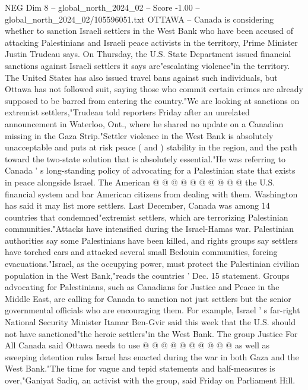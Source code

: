 \begin{textsample}{NEG Dim 8 – global\_north\_2024\_02 – Score -1.00 – global\_north\_2024\_02/105596051.txt}  \label{ex:f8_neg_434}
OTTAWA -- Canada is considering whether to sanction Israeli settlers in the West Bank who have been accused of attacking Palestinians and Israeli peace activists in the territory, Prime Minister Justin Trudeau says.
On Thursday, the U.S.
State Department issued financial sanctions against Israeli settlers it says are"escalating violence"in the territory.
The United States has also issued travel bans against such individuals, but Ottawa has not followed suit, saying those who commit certain crimes are already supposed to be barred from entering the country."We are looking at sanctions on extremist settlers,"Trudeau told reporters Friday after an unrelated announcement in Waterloo, Ont., where he shared no update on a Canadian missing in the Gaza Strip."Settler violence in the West Bank is absolutely unacceptable and puts at risk peace ( and ) stability in the region, and the path toward the two-state solution that is absolutely essential."He was referring to Canada ' s long-standing policy of advocating for a Palestinian state that exists in peace alongside Israel.
The American @ @ @ @ @ @ @ @ @ @ the U.S. financial system and bar American citizens from dealing with them.
Washington has said it may list more settlers.
Last December, Canada was among 14 countries that condemned"extremist settlers, which are terrorizing Palestinian communities."Attacks have intensified during the Israel-Hamas war.
Palestinian authorities say some Palestinians have been killed, and rights groups say settlers have torched cars and attacked several small Bedouin communities, forcing evacuations."Israel, as the occupying power, must protect the Palestinian civilian population in the West Bank,"reads the countries ' Dec. 15 statement.
Groups advocating for Palestinians, such as Canadians for Justice and Peace in the Middle East, are calling for Canada to sanction not just settlers but the senior governmental officials who are encouraging them.
For example, Israel ' s far-right National Security Minister Itamar Ben-Gvir said this week that the U.S. should not have sanctioned"the heroic settlers"in the West Bank.
The group Justice For All Canada said Ottawa needs to use @ @ @ @ @ @ @ @ @ @ as well as sweeping detention rules Israel has enacted during the war in both Gaza and the West Bank."The time for vague and tepid statements and half-measures is over,"Ganiyat Sadiq, an activist with the group, said Friday on Parliament Hill.

\end{textsample}
